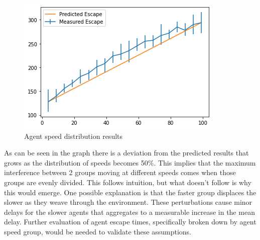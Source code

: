 \documentclass[12pt,letterpaper]{article}
\begin{document}
\begin{figure} [!ht]
  \centering
  \includegraphics[width=.75\linewidth]{./figures/speed_dist_test.png}
  \caption{Agent speed distribution results}
  \label{fig:speedResults}
\end{figure}

As can be seen in the graph there is a deviation from the predicted results that grows as the distribution of speeds becomes 50\%.  This implies that the maximum interference between 2 groups moving at different speeds comes when those groups are evenly divided.  This follows intuition, but what doesn't follow is why this would emerge.  One possible explanation is that the faster group displaces the slower as they weave through the environment.  These perturbations cause minor delays for the slower agents that aggregates to a measurable increase in the mean delay.  Further evaluation of agent escape times, specifically broken down by agent speed group, would be needed to validate these assumptions.
\end{document}
